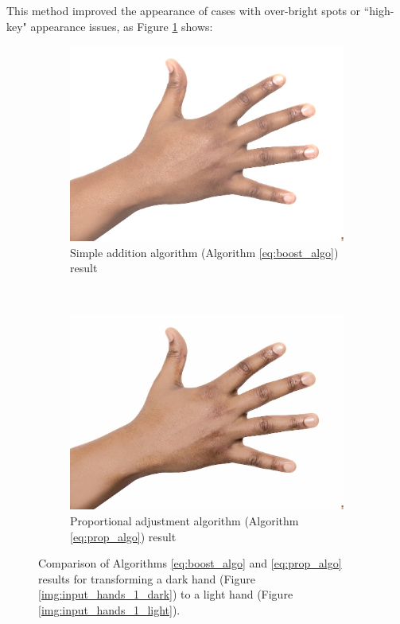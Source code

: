 This method improved the appearance of cases with over-bright spots or ``high-key" appearance issues, as Figure \ref{img:compare_bright_spot} shows:
\begin{figure}[H]
    \centering
    \begin{subfigure}[b]{0.40\textwidth}
        \includegraphics[width=\textwidth]{../rc_test/outputs/20170516_boost_test/hand_dark_to_hand_light.jpg}
        \caption{Simple addition algorithm (Algorithm \ref{eq:boost_algo}) result}
    \end{subfigure}
    ~
    \begin{subfigure}[b]{0.40\textwidth}
        \includegraphics[width=\textwidth]{../rc_test/outputs/20170516_proportional_test/hand_dark_to_hand_light.jpg}
        \caption{Proportional adjustment algorithm (Algorithm \ref{eq:prop_algo}) result}
    \end{subfigure}
    \caption{Comparison of Algorithms \ref{eq:boost_algo} and \ref{eq:prop_algo} results for transforming a dark hand (Figure \ref{img:input_hands_1_dark}) to a light hand (Figure \ref{img:input_hands_1_light}).\label{img:compare_bright_spot}}
\end{figure}

